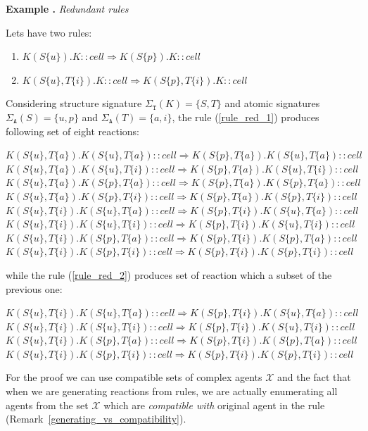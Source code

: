 \documentclass[12pt]{fithesis2}
\newcounter{counter}[section]
\renewcommand{\thecounter}{\thesection.\arabic{counter}}
\newenvironment{example}[1]{\bigskip\refstepcounter{counter}\noindent\textbf{Example \thecounter} \textit{#1} \par\nopagebreak}{\bigskip}
\begin{document}
\begin{example}{Redundant rules}
Lets have two rules:

\begin{enumerate}
	\item \label{rule_red_1} $K(S\{u\}).K::cell \Rightarrow K(S\{p\}).K::cell$
	\item \label{rule_red_2} $K(S\{u\}, T\{i\}).K::cell \Rightarrow K(S\{p\}, T\{i\}).K::cell$
\end{enumerate}

Considering structure signature $\Sigma_\mathtt{T}(K) = \{ S, T \} $ and atomic signatures $\Sigma_\mathtt{A}(S) = \{ u, p \} $ and $\Sigma_\mathtt{A}(T) = \{ a, i \} $, the rule (\ref{rule_red_1}) produces following set of eight reactions:

{\small
\begin{center}
$K(S\{u\}, T\{a\}).K(S\{u\}, T\{a\})::cell \Rightarrow K(S\{p\}, T\{a\}).K(S\{u\}, T\{a\})::cell$
$K(S\{u\}, T\{a\}).K(S\{u\}, T\{i\})::cell \Rightarrow K(S\{p\}, T\{a\}).K(S\{u\}, T\{i\})::cell$
$K(S\{u\}, T\{a\}).K(S\{p\}, T\{a\})::cell \Rightarrow K(S\{p\}, T\{a\}).K(S\{p\}, T\{a\})::cell$
$K(S\{u\}, T\{a\}).K(S\{p\}, T\{i\})::cell \Rightarrow K(S\{p\}, T\{a\}).K(S\{p\}, T\{i\})::cell$
$K(S\{u\}, T\{i\}).K(S\{u\}, T\{a\})::cell \Rightarrow K(S\{p\}, T\{i\}).K(S\{u\}, T\{a\})::cell$
$K(S\{u\}, T\{i\}).K(S\{u\}, T\{i\})::cell \Rightarrow K(S\{p\}, T\{i\}).K(S\{u\}, T\{i\})::cell$
$K(S\{u\}, T\{i\}).K(S\{p\}, T\{a\})::cell \Rightarrow K(S\{p\}, T\{i\}).K(S\{p\}, T\{a\})::cell$
$K(S\{u\}, T\{i\}).K(S\{p\}, T\{i\})::cell \Rightarrow K(S\{p\}, T\{i\}).K(S\{p\}, T\{i\})::cell$
\end{center}
}

while the rule (\ref{rule_red_2}) produces set of reaction which a subset of the previous one:

{\small
\begin{center}
$K(S\{u\}, T\{i\}).K(S\{u\}, T\{a\})::cell \Rightarrow K(S\{p\}, T\{i\}).K(S\{u\}, T\{a\})::cell$
$K(S\{u\}, T\{i\}).K(S\{u\}, T\{i\})::cell \Rightarrow K(S\{p\}, T\{i\}).K(S\{u\}, T\{i\})::cell$
$K(S\{u\}, T\{i\}).K(S\{p\}, T\{a\})::cell \Rightarrow K(S\{p\}, T\{i\}).K(S\{p\}, T\{a\})::cell$
$K(S\{u\}, T\{i\}).K(S\{p\}, T\{i\})::cell \Rightarrow K(S\{p\}, T\{i\}).K(S\{p\}, T\{i\})::cell$
\end{center}
}

\end{example}

For the proof we can use compatible sets of complex agents $\mathscr{X}$ and the fact that when we are generating reactions from rules, we are actually enumerating all agents from the set $\mathscr{X}$ which are \emph{compatible with} original agent in the rule (Remark~\ref{generating_vs_compatibility}).
\end{document}
